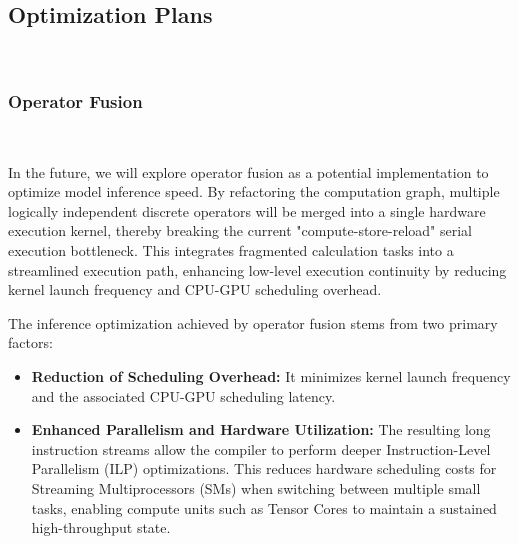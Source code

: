 

\subsection{Optimization Plans}
\ 

\subsubsection{Operator Fusion}
\ 


In the future, we will explore operator fusion as a potential implementation to optimize model inference speed. By refactoring the computation graph, multiple logically independent discrete operators will be merged into a single hardware execution kernel, thereby breaking the current "compute-store-reload" serial execution bottleneck. This integrates fragmented calculation tasks into a streamlined execution path, enhancing low-level execution continuity by reducing kernel launch frequency and CPU-GPU scheduling overhead.

The inference optimization achieved by operator fusion stems from two primary factors:


\begin{itemize}
    \item \textbf{Reduction of Scheduling Overhead:} It minimizes kernel launch frequency and the associated CPU-GPU scheduling latency.
    \item \textbf{Enhanced Parallelism and Hardware Utilization:} The resulting long instruction streams allow the compiler to perform deeper Instruction-Level Parallelism (ILP) optimizations. This reduces hardware scheduling costs for Streaming Multiprocessors (SMs) when switching between multiple small tasks, enabling compute units such as Tensor Cores to maintain a sustained high-throughput state.
\end{itemize}

